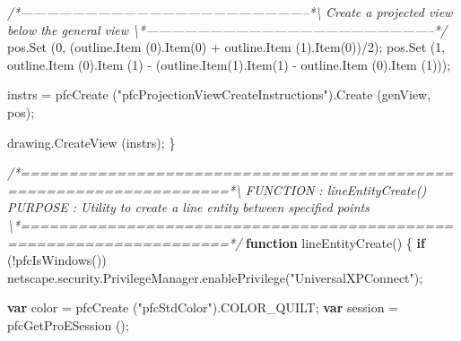 \documentclass[]{article}
\newenvironment{Shaded}{}{}
\newcommand{\KeywordTok}[1]{\textcolor[rgb]{0.00,0.44,0.13}{\textbf{{#1}}}}
\newcommand{\DecValTok}[1]{\textcolor[rgb]{0.25,0.63,0.44}{{#1}}}
\newcommand{\StringTok}[1]{\textcolor[rgb]{0.25,0.44,0.63}{{#1}}}
\newcommand{\CommentTok}[1]{\textcolor[rgb]{0.38,0.63,0.69}{\textit{{#1}}}}
\newcommand{\OtherTok}[1]{\textcolor[rgb]{0.00,0.44,0.13}{{#1}}}
\newcommand{\FunctionTok}[1]{\textcolor[rgb]{0.02,0.16,0.49}{{#1}}}
\newcommand{\NormalTok}[1]{{#1}}
\begin{document}
\begin{Shaded}
\begin{Highlighting}[]
\CommentTok{/*--------------------------------------------------------------------*\textbackslash{}     }
\CommentTok{  Create a projected view below the general view }
\CommentTok{\textbackslash{}*--------------------------------------------------------------------*/} 
  \OtherTok{pos}\NormalTok{.}\FunctionTok{Set} \NormalTok{(}\DecValTok{0}\NormalTok{, (}\OtherTok{outline}\NormalTok{.}\FunctionTok{Item} \NormalTok{(}\DecValTok{0}\NormalTok{).}\FunctionTok{Item}\NormalTok{(}\DecValTok{0}\NormalTok{) + }\OtherTok{outline}\NormalTok{.}\FunctionTok{Item} \NormalTok{(}\DecValTok{1}\NormalTok{).}\FunctionTok{Item}\NormalTok{(}\DecValTok{0}\NormalTok{))/}\DecValTok{2}\NormalTok{);}
  \OtherTok{pos}\NormalTok{.}\FunctionTok{Set} \NormalTok{(}\DecValTok{1}\NormalTok{, }\OtherTok{outline}\NormalTok{.}\FunctionTok{Item} \NormalTok{(}\DecValTok{0}\NormalTok{).}\FunctionTok{Item} \NormalTok{(}\DecValTok{1}\NormalTok{) - (}\OtherTok{outline}\NormalTok{.}\FunctionTok{Item}\NormalTok{(}\DecValTok{1}\NormalTok{).}\FunctionTok{Item}\NormalTok{(}\DecValTok{1}\NormalTok{) - }
                       \OtherTok{outline}\NormalTok{.}\FunctionTok{Item} \NormalTok{(}\DecValTok{0}\NormalTok{).}\FunctionTok{Item} \NormalTok{(}\DecValTok{1}\NormalTok{)));}
  
  \NormalTok{instrs = }
    \FunctionTok{pfcCreate} \NormalTok{(}\StringTok{"pfcProjectionViewCreateInstructions"}\NormalTok{).}\FunctionTok{Create} \NormalTok{(genView, }
                                  \NormalTok{pos);}
    
  \OtherTok{drawing}\NormalTok{.}\FunctionTok{CreateView} \NormalTok{(instrs);}
\NormalTok{\}}


\CommentTok{/*====================================================================*\textbackslash{} }
\CommentTok{FUNCTION : lineEntityCreate() }
\CommentTok{PURPOSE  : Utility to create a line entity between specified points }
\CommentTok{\textbackslash{}*====================================================================*/} 
\KeywordTok{function} \FunctionTok{lineEntityCreate}\NormalTok{()}
\NormalTok{\{}
  \KeywordTok{if} \NormalTok{(!}\FunctionTok{pfcIsWindows}\NormalTok{())}
    \OtherTok{netscape}\NormalTok{.}\OtherTok{security}\NormalTok{.}\OtherTok{PrivilegeManager}\NormalTok{.}\FunctionTok{enablePrivilege}\NormalTok{(}\StringTok{"UniversalXPConnect"}\NormalTok{); }
  
  \KeywordTok{var} \NormalTok{color = }\FunctionTok{pfcCreate} \NormalTok{(}\StringTok{"pfcStdColor"}\NormalTok{).}\FunctionTok{COLOR_QUILT}\NormalTok{;}
  \KeywordTok{var} \NormalTok{session = }\FunctionTok{pfcGetProESession} \NormalTok{();}
  

\end{Highlighting}
\end{Shaded}
\end{document}

